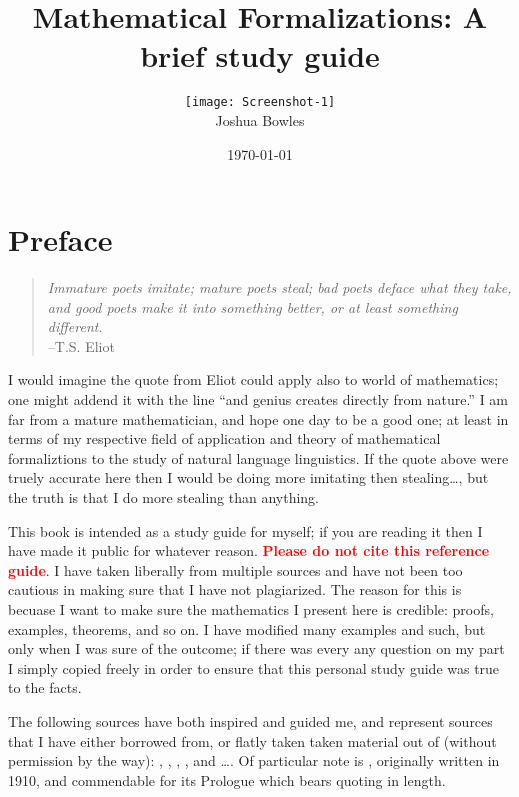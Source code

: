 \documentclass{book}
\begin{document}
\title{Mathematical Formalizations: A brief study guide}
 \author{\texttt{[image: Screenshot-1]}\\ Joshua Bowles\\ \date{\today}}
         
\maketitle

\tableofcontents 
\listoffigures 
\listoftables 
  
\chapter*{Preface}
\begin{quote}
     \textsl{Immature poets imitate; mature poets steal; bad poets deface what they take, and good poets make it into something better, or at least something different}.\\ --T.S. Eliot
\end{quote}


I would imagine the quote from Eliot could apply also to world of mathematics; one might addend it with the line ``and genius creates directly from nature.'' I am far from a mature mathematician, and hope one day to be a good one; at least in terms of my respective field of application and theory of mathematical formaliztions to the study of natural language linguistics. If the quote above were truely accurate here then I would be doing more imitating then stealing\ldots, but the truth is that I do more stealing than anything.

This book is intended as a study guide for myself; if you are reading it then I have made it public for whatever reason. \textcolor{red}{\textbf{Please do not cite this reference guide}}. I have taken liberally from multiple sources and have not been too cautious in making sure that I have not plagiarized. The reason for this is becuase I want to make sure the mathematics I present here is credible: proofs, examples, theorems, and so on. I have modified many examples and such, but only when I was sure of the outcome; if there was every any question on my part I simply copied freely in order to ensure that this personal study guide was true to the facts. 

The following sources have both inspired and guided me, and represent sources that I have either borrowed from, or flatly taken taken material out of (without permission by the way): \cite{gustfriskalgebra}, \cite{mathbook}, \cite{pmw:1990}, \cite{kleene:1967}, and \ldots. Of particular note is \cite{silvthomp}, originally written in 1910, and commendable for its Prologue which bears quoting in length.
\end{document}
